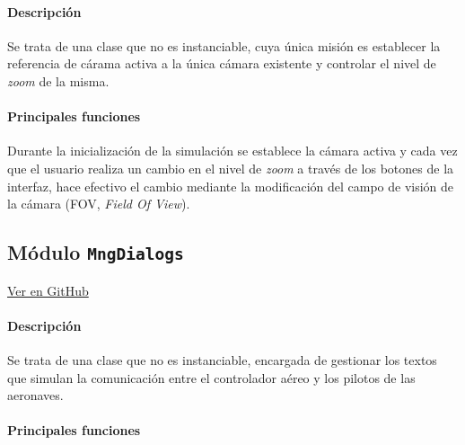 \paragraph{Descripción} \phantom{\newline}

Se trata de una clase que no es instanciable, cuya única misión es establecer la referencia de cárama activa a la única cámara existente y controlar el nivel de \textit{zoom} de la misma.

\paragraph{Principales funciones} \phantom{\newline}

Durante la inicialización de la simulación se establece la cámara activa y cada vez que el usuario realiza un cambio en el nivel de \textit{zoom} a través de los botones de la interfaz, hace efectivo el cambio mediante la modificación del campo de visión de la cámara (FOV, \textit{Field Of View}).





\subsection{Módulo \texttt{MngDialogs}}
\label{subsec:ClaseMngDialogs}

\vspace{-0.85cm}
\begin{flushright}
\href{https://github.com/macgyver912/atc-simulator/blob/jaime/Assets/Scripts/graphics/MngDialogs.cs}{Ver en GitHub \faGithub}
\end{flushright}

\paragraph{Descripción} \phantom{\newline}

Se trata de una clase que no es instanciable, encargada de gestionar los textos que simulan la comunicación entre el controlador aéreo y los pilotos de las aeronaves. 

\paragraph{Principales funciones} \phantom{\newline}

